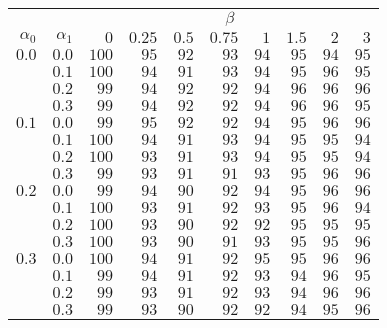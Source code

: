 \begin{tabular}{rr|rrrrrrrr}
\hline\hline
 && \multicolumn{8}{c}{$\beta$}\\
 $\alpha_0$ & $\alpha_1$ & $0$ & $0.25$ & $0.5$ & $0.75$ & $1$ & $1.5$ & $2$ & $3$ \\ 
 \hline
$0.0$ & $0.0$ & $100$ & $95$ & $92$ & $93$ & $94$ & $95$ & $94$ & $95$\\ 
 & $0.1$ & $100$ & $94$ & $91$ & $93$ & $94$ & $95$ & $96$ & $95$\\ 
 & $0.2$ & $99$ & $94$ & $92$ & $92$ & $94$ & $96$ & $96$ & $96$\\ 
 & $0.3$ & $99$ & $94$ & $92$ & $92$ & $94$ & $96$ & $96$ & $95$\\ 
\hline 
 $0.1$ & $0.0$ & $99$ & $95$ & $92$ & $92$ & $94$ & $95$ & $96$ & $96$\\ 
 & $0.1$ & $100$ & $94$ & $91$ & $93$ & $94$ & $95$ & $95$ & $94$\\ 
 & $0.2$ & $100$ & $93$ & $91$ & $93$ & $94$ & $95$ & $95$ & $94$\\ 
 & $0.3$ & $99$ & $93$ & $91$ & $91$ & $93$ & $95$ & $96$ & $96$\\ 
\hline 
 $0.2$ & $0.0$ & $99$ & $94$ & $90$ & $92$ & $94$ & $95$ & $96$ & $96$\\ 
 & $0.1$ & $100$ & $93$ & $91$ & $92$ & $93$ & $95$ & $96$ & $94$\\ 
 & $0.2$ & $100$ & $93$ & $90$ & $92$ & $92$ & $95$ & $95$ & $95$\\ 
 & $0.3$ & $100$ & $93$ & $90$ & $91$ & $93$ & $95$ & $95$ & $96$\\ 
\hline 
 $0.3$ & $0.0$ & $100$ & $94$ & $91$ & $92$ & $95$ & $95$ & $96$ & $96$\\ 
 & $0.1$ & $99$ & $94$ & $91$ & $92$ & $93$ & $94$ & $96$ & $95$\\ 
 & $0.2$ & $99$ & $93$ & $91$ & $92$ & $93$ & $94$ & $96$ & $96$\\ 
 & $0.3$ & $99$ & $93$ & $90$ & $92$ & $92$ & $94$ & $95$ & $96$\\ 
 \hline 
 \end{tabular}